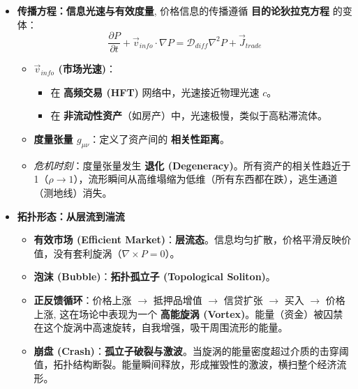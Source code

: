 \begin{itemize}
    \item \textbf{\textcolor{structurecolor}{传播方程：信息光速与有效度量}}, 价格信息的传播遵循 \textbf{目的论狄拉克方程} 的变体：
    $$ \frac{\partial P}{\partial t} + \vec{v}_{info} \cdot \nabla P = \mathcal{D}_{diff} \nabla^2 P + \vec{J}_{trade} $$
    \begin{itemize}
        \item   \textbf{$\vec{v}_{info}$ (市场光速)}：
        \begin{itemize}
            \item   在 \textbf{高频交易 (HFT)} 网络中，光速接近物理光速 $c$。
            \item   在 \textbf{非流动性资产}（如房产）中，光速极慢，类似于高粘滞流体。
        \end{itemize}
        \item   \textbf{度量张量 $g_{\mu\nu}$}：定义了资产间的 \textbf{相关性距离}。
        \item   \textit{危机时刻}：度量张量发生 \textbf{退化 (Degeneracy)}。所有资产的相关性趋近于 1（$\rho \to 1$），流形瞬间从高维塌缩为低维（所有东西都在跌），逃生通道（测地线）消失。
    \end{itemize}

    \item \textbf{\textcolor{structurecolor}{拓扑形态：从层流到湍流}}
    \begin{itemize}
        \item   \textbf{有效市场 (Efficient Market)}：\textbf{层流态}。信息均匀扩散，价格平滑反映价值，没有套利旋涡（$\nabla \times P = 0$）。
        \item   \textbf{泡沫 (Bubble)}：\textbf{拓扑孤立子 (Topological Soliton)}。
        \item   \textbf{正反馈循环}：价格上涨 $\to$ 抵押品增值 $\to$ 信贷扩张 $\to$ 买入 $\to$ 价格上涨, 这在场论中表现为一个 \textbf{高能旋涡 (Vortex)}。能量（资金）被囚禁在这个旋涡中高速旋转，自我增强，吸干周围流形的能量。
        \item   \textbf{崩盘 (Crash)}：\textbf{孤立子破裂与激波}。当旋涡的能量密度超过介质的击穿阈值，拓扑结构断裂。能量瞬间释放，形成摧毁性的激波，横扫整个经济流形。
    \end{itemize}
\end{itemize}



